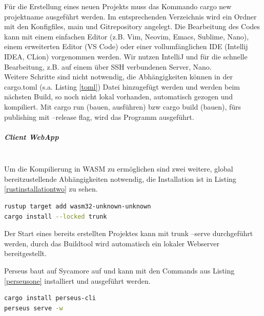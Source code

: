 \documentclass[notitlepage, hidelinks]{article}
\begin{document}
Für die Erstellung eines neuen Projekts muss das Kommando cargo new projektname ausgeführt werden. Im entsprechenden Verzeichnis wird ein Ordner mit den Konfigfiles, main und Gitrepository angelegt. Die Bearbeitung des Codes kann mit einem einfachen Editor (z.B. Vim, Neovim, Emacs, Sublime, Nano), einem erweiterten Editor (VS Code) oder einer vollumfänglichen IDE (Intellij IDEA, CLion) vorgenommen werden. Wir nutzen IntelliJ und für die schnelle Bearbeitung, z.B. auf einem über SSH verbundenen Server, Nano. \\
Weitere Schritte sind nicht notwendig, die Abhängigkeiten können in der cargo.toml (s.a. Listing \ref{toml}) Datei hinzugefügt werden und werden beim nächsten Build, so noch nicht lokal vorhanden, automatisch gezogen und kompiliert. Mit cargo run (bauen, ausführen) bzw cargo build (bauen), fürs publishing mit --release flag, wird das Programm ausgeführt. 

\subparagraph{Client WebApp} \mbox{} \\
Um die Kompilierung in WASM zu ermöglichen sind zwei weitere, global bereitzustellende Abhängigkeiten notwendig, die Installation ist in Listing \ref{rustinstallationtwo} zu sehen.

\begin{lstlisting}[language=bash,frame=single,caption=CLI Command zur Installation der Laufzeitumgebung webassembly und des WASM-Buildtools Trunk für Rust,label=rustinstallationtwo]
rustup target add wasm32-unknown-unknown
cargo install --locked trunk
\end{lstlisting}

Der Start eines bereits erstellten Projektes kann mit trunk --serve durchgeführt werden, durch das Buildtool wird automatisch ein lokaler Webserver bereitgestellt.

Perseus baut auf Sycamore auf und kann mit den Commands aus Listing \ref{perseusone} installiert und ausgeführt werden.

\begin{lstlisting}[language=bash,frame=single,caption=CLI Command zur Installation der Perseus CLI und Ausführung eines Projektes,label=perseusone]
cargo install perseus-cli
perseus serve -w
\end{lstlisting}
\end{document}

